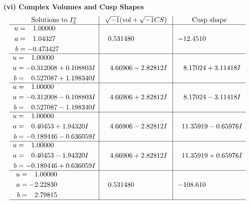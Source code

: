 \documentclass[1p]{elsarticle_modified}
\theoremstyle{definition}
\newcommand{\I}{\sqrt{-1}}
\begin{document}
\newpage\flushleft \textbf{(vi) Complex Volumes and Cusp Shapes}
$$\begin{array}{c|c|c}  
\text{Solutions to }I^u_{3}& \I (\text{vol} + \sqrt{-1}CS) & \text{Cusp shape}\\
 \hline 
\begin{aligned}
u &= \phantom{-}1.00000\phantom{ +0.000000I} \\
a &= \phantom{-}1.04327\phantom{ +0.000000I} \\
b &= -0.473427\phantom{ +0.000000I}\end{aligned}
 & \phantom{-}0.531480\phantom{ +0.000000I} & -12.4510\phantom{ +0.000000I} \\ \hline\begin{aligned}
u &= \phantom{-}1.00000\phantom{ +0.000000I} \\
a &= -0.312008 + 0.108803 I \\
b &= \phantom{-}0.527087 + 1.198340 I\end{aligned}
 & \phantom{-}4.66906 - 2.82812 I & \phantom{-}8.17024 + 3.11418 I \\ \hline\begin{aligned}
u &= \phantom{-}1.00000\phantom{ +0.000000I} \\
a &= -0.312008 - 0.108803 I \\
b &= \phantom{-}0.527087 - 1.198340 I\end{aligned}
 & \phantom{-}4.66906 + 2.82812 I & \phantom{-}8.17024 - 3.11418 I \\ \hline\begin{aligned}
u &= \phantom{-}1.00000\phantom{ +0.000000I} \\
a &= \phantom{-}0.40453 + 1.94320 I \\
b &= -0.189446 - 0.636059 I\end{aligned}
 & \phantom{-}4.66906 - 2.82812 I & \phantom{-}11.35919 - 0.65976 I \\ \hline\begin{aligned}
u &= \phantom{-}1.00000\phantom{ +0.000000I} \\
a &= \phantom{-}0.40453 - 1.94320 I \\
b &= -0.189446 + 0.636059 I\end{aligned}
 & \phantom{-}4.66906 + 2.82812 I & \phantom{-}11.35919 + 0.65976 I \\ \hline\begin{aligned}
u &= \phantom{-}1.00000\phantom{ +0.000000I} \\
a &= -2.22830\phantom{ +0.000000I} \\
b &= \phantom{-}2.79815\phantom{ +0.000000I}\end{aligned}
 & \phantom{-}0.531480\phantom{ +0.000000I} & -108.610\phantom{ +0.000000I}\\
 \hline 
 \end{array}$$\newpage
\end{document}
